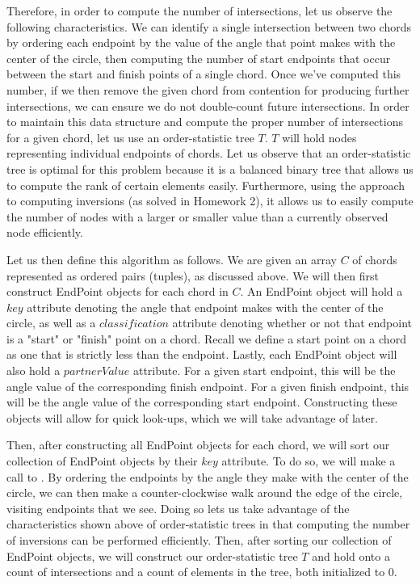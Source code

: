 \documentclass[11pt]{article}
\begin{document}
Therefore, in order to compute the number of intersections, let us observe the following characteristics. We can identify a single intersection between two chords by ordering each endpoint by the value of the angle that point makes with the center of the circle, then computing the number of start endpoints that occur between the start and finish points of a single chord. Once we've computed this number, if we then remove the given chord from contention for producing further intersections, we can ensure we do not double-count future intersections. In order to maintain this data structure and compute the proper number of intersections for a given chord, let us use an order-statistic tree $T$. $T$ will hold nodes representing individual endpoints of chords. Let us observe that an order-statistic tree is optimal for this problem because it is a balanced binary tree that allows us to compute the rank of certain elements easily. Furthermore, using the approach to computing inversions (as solved in Homework 2), it allows us to easily compute the number of nodes with a larger or smaller value than a currently observed node efficiently.

Let us then define this algorithm as follows. We are given an array $C$ of chords represented as ordered pairs (tuples), as discussed above. We will then first construct EndPoint objects for each chord in $C$. An EndPoint object will hold a $key$ attribute denoting the angle that endpoint makes with the center of the circle, as well as a $classification$ attribute denoting whether or not that endpoint is a "start" or "finish" point on a chord. Recall we define a start point on a chord as one that is strictly less than the endpoint. Lastly, each EndPoint object will also hold a $partnerValue$ attribute. For a given start endpoint, this will be the angle value of the corresponding finish endpoint. For a given finish endpoint, this will be the angle value of the corresponding start endpoint. Constructing these objects will allow for quick look-ups, which we will take advantage of later.

Then, after constructing all EndPoint objects for each chord, we will sort our collection of EndPoint objects by their $key$ attribute. To do so, we will make a call to . By ordering the endpoints by the angle they make with the center of the circle, we can then make a counter-clockwise walk around the edge of the circle, visiting endpoints that we see. Doing so lets us take advantage of the characteristics shown above of order-statistic trees in that computing the number of inversions can be performed efficiently. Then, after sorting our collection of EndPoint objects, we will construct our order-statistic tree $T$ and hold onto a count of intersections and a count of elements in the tree, both initialized to 0.
\end{document}
